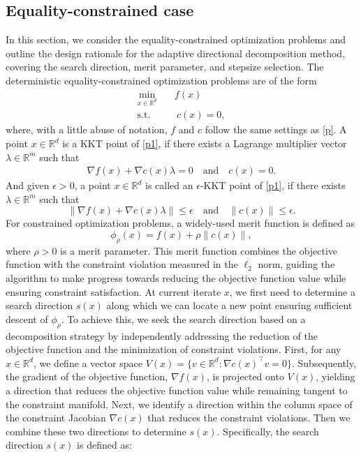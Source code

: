 \documentclass[11pt]{article}
\newcommand{\R}{\mathbb{R}}
\newcommand{\be}{\begin{equation}}
\newcommand{\ee}{\end{equation}}
\begin{document}
\subsection{Equality-constrained case}\label{ssec:eqc}
In this section, we consider the equality-constrained optimization problems and outline the design rationale for the adaptive directional decomposition method, covering the search direction, merit parameter, and stepsize selection. The deterministic equality-constrained optimization problems are of the form
\be\label{p1}
\begin{aligned}
    \min_{x \in \R^d} &\quad f(x) \\
   \text{s.t.} & \quad~c(x)=0,
\end{aligned}
\ee
where, with a little abuse of notation, $f$ and $c$ follow the same settings as \eqref{p}. A point $x\in\R^d$ is a KKT point of \eqref{p1}, if there exists a Lagrange multiplier vector \(\lambda\in \R^m\) such that
\begin{align}\label{ekkt-eq}
    \nabla f(x) + \nabla c(x) \lambda=0  \quad\mbox{and}\quad c(x)=0.
\end{align}
And given $\epsilon>0$, a point $x\in\R^d$ is called an $\epsilon$-KKT point of \eqref{p1}, if there exists $\lambda\in\R^m$ such that 
\[
\|\nabla f(x) + \nabla c(x) \lambda\|\le \epsilon\quad\mbox{and}\quad \|c(x)\|\le \epsilon.
\]
For constrained optimization problems, a widely-used merit function is defined as 
\[
\phi_\rho(x) = f(x) + \rho \|c(x)\|,
\]
where \(\rho > 0\) is a merit parameter. This merit function combines the objective function with the constraint violation measured in the $\ell_2$ norm, guiding the algorithm to make progress towards reducing the objective function value while ensuring constraint satisfaction. %
At current iterate $x$, we first need to determine a search direction $s(x)$ along which we can locate a new point ensuring sufficient descent of $\phi_\rho$. To achieve this, we seek the search direction  based on a decomposition strategy by independently addressing the reduction of the objective function and the minimization of constraint violations. First, for any \( x \in \mathbb{R}^d \), we define a vector space \( V(x) = \{ v \in \mathbb{R}^d : \nabla c(x)^{\top} v = 0 \} \). Subsequently, the gradient of the objective function, \(\nabla f(x)\), is projected onto \( V(x) \), yielding a direction that reduces the objective function value while remaining tangent to the constraint manifold. Next, we identify a direction within the column space of the constraint Jacobian \(\nabla c(x)\) that reduces the constraint {violations}. {Then we combine these two directions to determine \(s(x)\).} Specifically, the {search direction \(s(x)\)} is defined as:
\end{document}
